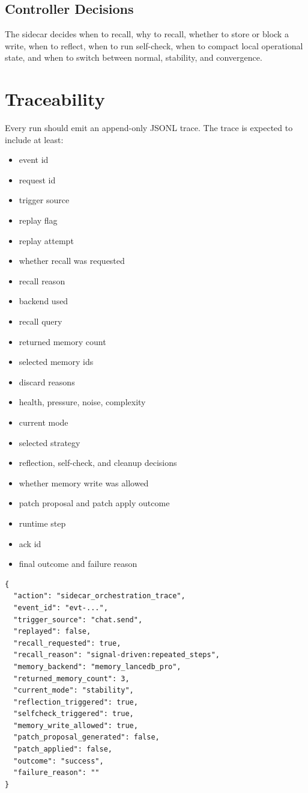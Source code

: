 \documentclass[11pt,a4paper,oneside,openany]{book}
\begin{document}
\section{Controller Decisions}
The sidecar decides when to recall, why to recall, whether to store or block a write, when to reflect, when to run self-check, when to compact local operational state, and when to switch between normal, stability, and convergence.
\chapter{Traceability}
Every run should emit an append-only JSONL trace. The trace is expected to include at least:
\begin{itemize}
  \item event id
  \item request id
  \item trigger source
  \item replay flag
  \item replay attempt
  \item whether recall was requested
  \item recall reason
  \item backend used
  \item recall query
  \item returned memory count
  \item selected memory ids
  \item discard reasons
  \item health, pressure, noise, complexity
  \item current mode
  \item selected strategy
  \item reflection, self-check, and cleanup decisions
  \item whether memory write was allowed
  \item patch proposal and patch apply outcome
  \item runtime step
  \item ack id
  \item final outcome and failure reason
\end{itemize}
\begin{Verbatim}[fontsize=\small]
{
  "action": "sidecar_orchestration_trace",
  "event_id": "evt-...",
  "trigger_source": "chat.send",
  "replayed": false,
  "recall_requested": true,
  "recall_reason": "signal-driven:repeated_steps",
  "memory_backend": "memory_lancedb_pro",
  "returned_memory_count": 3,
  "current_mode": "stability",
  "reflection_triggered": true,
  "selfcheck_triggered": true,
  "memory_write_allowed": true,
  "patch_proposal_generated": false,
  "patch_applied": false,
  "outcome": "success",
  "failure_reason": ""
}
\end{Verbatim}
\end{document}
